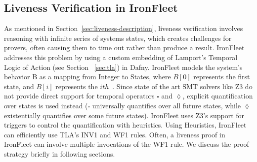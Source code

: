 \documentclass{llncs}
\begin{document}
\subsection{Liveness Verification in IronFleet}\label{sec:liveness-ironfleet}
As mentioned in Section~\ref{sec:liveness-description}, liveness verification involves
reasoning with infinite series of systems states, which creates challenges for 
provers, often causing them to time out rather than produce a result. IronFleet addresses
this problem by using a custom embedding of Lamport's Temporal Logic of Action (see Section 
~\ref{sec:tla}) in Dafny. IronFleet models the system's behavior B as a mapping from Integer to
States, where $B[0]$ represents the first state, and $B[i]$ represents the $ith$~\cite{ironfleet}. 
Since state of the art SMT solvers like Z3 do not provide direct support for temporal operators
$\square$ and $\lozenge$, explicit quantification over states is used instead ($\square$ universally
quantifies over all future states, while $\lozenge$ existentially quantifies over some future states).
IronFleet uses Z3's support for triggers to control the quantification with heuristics. 
Using Heuristics, IronFleet can efficiently use TLA's INV1 and WF1 rules. Often, a liveness proof in 
IronFleet can involve multiple invocations of the WF1 rule. We discuss the proof strategy briefly
in following sections.
\end{document}
